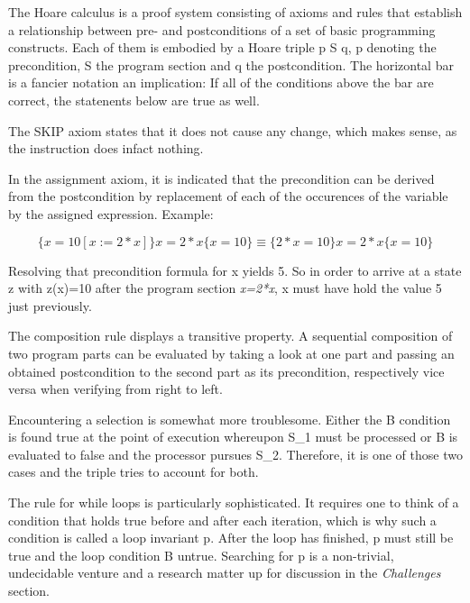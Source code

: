 The Hoare calculus is a proof system consisting of axioms and rules that establish a relationship between pre- and postconditions of a set of basic programming constructs. Each of them is embodied by a Hoare triple {p} S {q}, p denoting the precondition, S the program section and q the postcondition. The horizontal bar is a fancier notation an implication: If all of the conditions above the bar are correct, the statenents below are true as well.

The SKIP axiom states that it does not cause any change, which makes sense, as the instruction does infact nothing.

In the assignment axiom, it is indicated that the precondition can be derived from the postcondition by replacement of each of the occurences of the variable by the assigned expression. Example:

%

\newenvironment{hoare}[0]{\begin{equation}}{\end{equation}}

\begin{hoare}
	\{x=10[x:=2*x]\} x=2*x \{x=10\} \equiv \{2*x=10\} x=2*x \{x=10\}
\end{hoare}

Resolving that precondition formula for x yields 5. So in order to arrive at a state z with z(x)=10 after the program section \textit{x=2*x}, x must have hold the value 5 just previously.

The composition rule displays a transitive property. A sequential composition of two program parts can be evaluated by taking a look at one part and passing an obtained postcondition to the second part as its precondition, respectively vice versa when verifying from right to left.

Encountering a selection is somewhat more troublesome. Either the B condition is found true at the point of execution whereupon S\_1 must be processed or B is evaluated to false and the processor pursues S\_2. Therefore, it is one of those two cases and the triple tries to account for both.

The rule for while loops is particularly sophisticated. It requires one to think of a condition that holds true before and after each iteration, which is why such a condition is called a loop invariant p. After the loop has finished, p must still be true and the loop condition B untrue. Searching for p is a non-trivial, undecidable venture and a research matter up for discussion in the \textit{Challenges} section.

